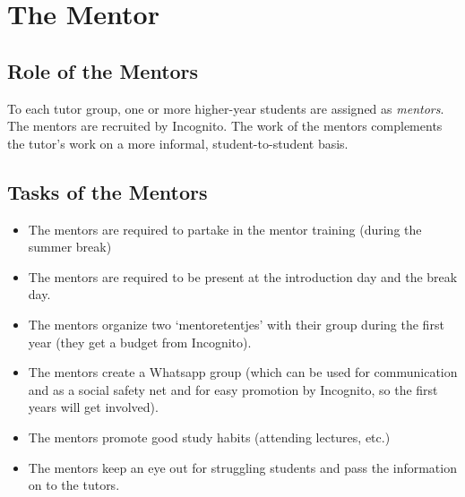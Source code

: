 \chapter{The Mentor}

\section{Role of the Mentors}

To each tutor group, one or more higher-year students are assigned as \emph{mentors}.
The mentors are recruited by Incognito.
The work of the mentors complements the tutor's work on a more informal, student-to-student basis.

\section{Tasks of the Mentors}

\begin{itemize}

	\item The mentors are required to partake in the mentor training (during the summer break)

	\item The mentors are required to be present at the introduction day and the break day.

	\item The mentors organize two `mentoretentjes' with their group during the first year (they get a budget from Incognito).

	\item The mentors create a Whatsapp group (which can be used for communication and as a social safety net and for easy promotion by Incognito, so the first years will get involved).

	\item The mentors promote good study habits (attending lectures, etc.)

	\item The mentors keep an eye out for struggling students and pass the information on to the tutors.

\end{itemize}


